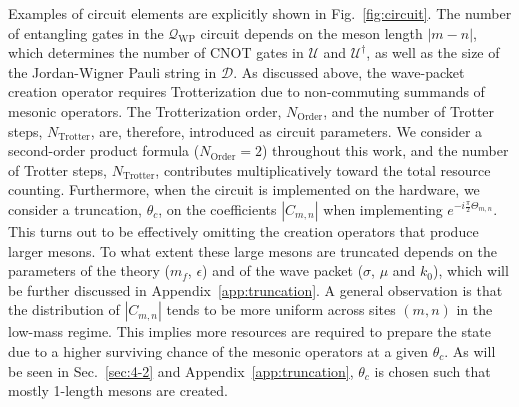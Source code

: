 \documentclass[a4paper,onecolumn,11pt,accepted=2024-10-11]{quantumarticle}
\begin{document}
Examples of circuit elements are explicitly shown in Fig.~\ref{fig:circuit}. The number of entangling gates in the $\mathcal{Q}_\text{WP}$ circuit depends on the meson length $|m-n|$, which determines the number of CNOT gates in $\mathcal{U}$ and $\mathcal{U}^\dagger$, as well as the size of the Jordan-Wigner Pauli string in $\mathcal{D}$. As discussed above, the wave-packet creation operator requires Trotterization due to non-commuting summands of mesonic operators. The Trotterization order, $N_{\text{Order}}$, and the number of Trotter steps, $N_{\text{Trotter}}$, are, therefore, introduced as circuit parameters. We consider a second-order product formula ($N_{\text{Order}}=2$) throughout this work, and the number of Trotter steps, $N_{\text{Trotter}}$, contributes multiplicatively toward the total resource counting. Furthermore, when the circuit is implemented on the hardware, we consider a truncation, $\theta_{c}$, on the coefficients $|C_{m,n}|$ when implementing $e^{-i\frac{\pi}{2} \Theta_{m,n}}$. 
This turns out to be effectively omitting the creation operators that produce larger mesons. To what extent these large mesons are truncated depends on the parameters of the theory ($m_f$, $\epsilon$) and of the wave packet ($\sigma$, $\mu$ and $k_0$), which will be further discussed in Appendix~\ref{app:truncation}. A general observation is that the distribution of $|C_{m,n}|$ tends to be more uniform across sites $(m,n)$ in the low-mass regime. This implies more resources are required to prepare the state due to a higher surviving chance of the mesonic operators at a given $\theta_{c}$. As will be seen in Sec.~\ref{sec:4-2} and Appendix~\ref{app:truncation}, $\theta_{c}$ is chosen such that mostly 1-length mesons are created. 
\end{document}

